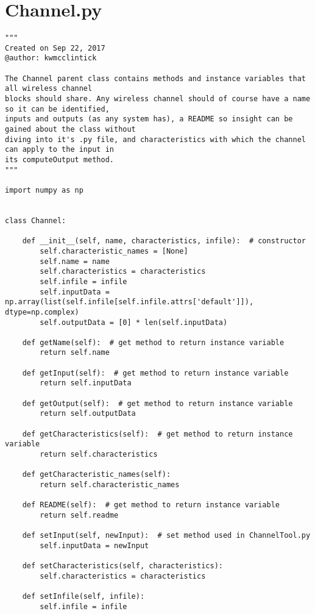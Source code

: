 \section{Channel.py}
\begin{lstlisting}[breaklines]
"""
Created on Sep 22, 2017
@author: kwmcclintick

The Channel parent class contains methods and instance variables that all wireless channel
blocks should share. Any wireless channel should of course have a name so it can be identified,
inputs and outputs (as any system has), a README so insight can be gained about the class without
diving into it's .py file, and characteristics with which the channel can apply to the input in
its computeOutput method.
"""

import numpy as np


class Channel:

    def __init__(self, name, characteristics, infile):  # constructor
        self.characteristic_names = [None]
        self.name = name
        self.characteristics = characteristics
        self.infile = infile
        self.inputData = np.array(list(self.infile[self.infile.attrs['default']]), dtype=np.complex)
        self.outputData = [0] * len(self.inputData)
        
    def getName(self):  # get method to return instance variable
        return self.name
    
    def getInput(self):  # get method to return instance variable
        return self.inputData
    
    def getOutput(self):  # get method to return instance variable
        return self.outputData

    def getCharacteristics(self):  # get method to return instance variable
        return self.characteristics

    def getCharacteristic_names(self):
        return self.characteristic_names
    
    def README(self):  # get method to return instance variable
        return self.readme

    def setInput(self, newInput):  # set method used in ChannelTool.py
        self.inputData = newInput

    def setCharacteristics(self, characteristics):
        self.characteristics = characteristics

    def setInfile(self, infile):
        self.infile = infile
\end{lstlisting}

